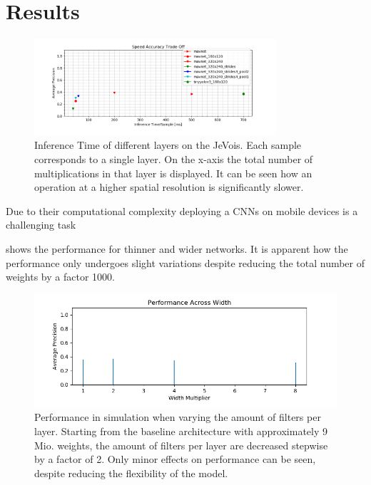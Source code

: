 \section{Results}

\begin{figure}[hbtp]
	\centering
	\includegraphics[width=0.8\textwidth]{fig/ap_speed_tradeoff}
	\caption{Inference Time of different layers on the JeVois. Each sample corresponds to a single layer. On the x-axis the total number of multiplications in that layer is displayed. It can be seen how an operation at a higher spatial resolution is significantly slower.}
	\label{fig:ap_speed_tradeoff}
\end{figure}

Due to their computational complexity deploying a \acp{CNN} on mobile devices is a challenging task


 shows the performance for thinner and wider networks. It is apparent how the performance only undergoes slight variations despite reducing the total number of weights by a factor 1000. 


\begin{figure}[hbtp]
	\centering
	\includegraphics[width=\textwidth]{fig/perf_width}
	\caption{Performance in simulation when varying the amount of filters per layer. Starting from the baseline architecture with approximately 9 Mio. weights, the amount of filters per layer are decreased stepwise by a factor of 2. Only minor effects on performance can be seen, despite reducing the flexibility of the model.}
	\label{fig:perf_width}
\end{figure}

